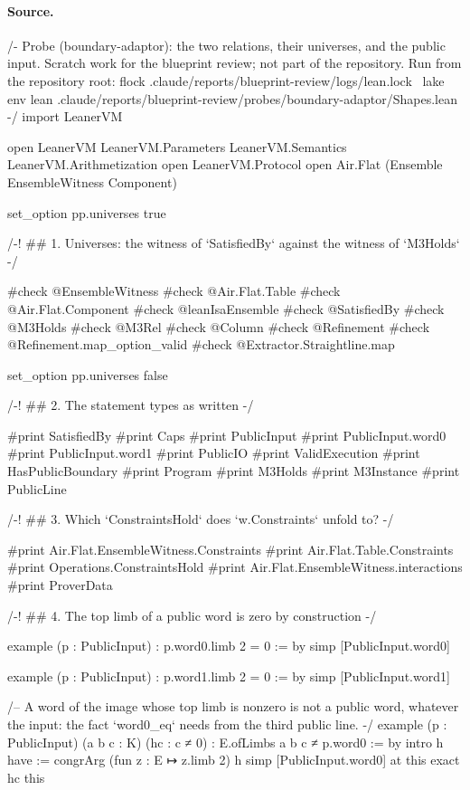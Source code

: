 \paragraph{Source.}
\begin{leancode}[numbers=left,numbersep=3pt]
/-
  Probe (boundary-adaptor): the two relations, their universes, and the public input.
  Scratch work for the blueprint review; not part of the repository.
  Run from the repository root:
    flock .claude/reports/blueprint-review/logs/lean.lock \
      lake env lean .claude/reports/blueprint-review/probes/boundary-adaptor/Shapes.lean
-/
import LeanerVM

open LeanerVM LeanerVM.Parameters LeanerVM.Semantics LeanerVM.Arithmetization
open LeanerVM.Protocol
open Air.Flat (Ensemble EnsembleWitness Component)

set_option pp.universes true

/-! ## 1. Universes: the witness of `SatisfiedBy` against the witness of `M3Holds` -/

#check @EnsembleWitness
#check @Air.Flat.Table
#check @Air.Flat.Component
#check @leanIsaEnsemble
#check @SatisfiedBy
#check @M3Holds
#check @M3Rel
#check @Column
#check @Refinement
#check @Refinement.map_option_valid
#check @Extractor.Straightline.map

set_option pp.universes false

/-! ## 2. The statement types as written -/

#print SatisfiedBy
#print Caps
#print PublicInput
#print PublicInput.word0
#print PublicInput.word1
#print PublicIO
#print ValidExecution
#print HasPublicBoundary
#print Program
#print M3Holds
#print M3Instance
#print PublicLine

/-! ## 3. Which `ConstraintsHold` does `w.Constraints` unfold to? -/

#print Air.Flat.EnsembleWitness.Constraints
#print Air.Flat.Table.Constraints
#print Operations.ConstraintsHold
#print Air.Flat.EnsembleWitness.interactions
#print ProverData

/-! ## 4. The top limb of a public word is zero by construction -/

example (p : PublicInput) : p.word0.limb 2 = 0 := by
  simp [PublicInput.word0]

example (p : PublicInput) : p.word1.limb 2 = 0 := by
  simp [PublicInput.word1]

/-- A word of the image whose top limb is nonzero is not a public word, whatever the input: the
fact `word0_eq` needs from the third public line. -/
example (p : PublicInput) (a b c : K) (hc : c ≠ 0) : E.ofLimbs a b c ≠ p.word0 := by
  intro h
  have := congrArg (fun z : E ↦ z.limb 2) h
  simp [PublicInput.word0] at this
  exact hc this


\end{leancode}
